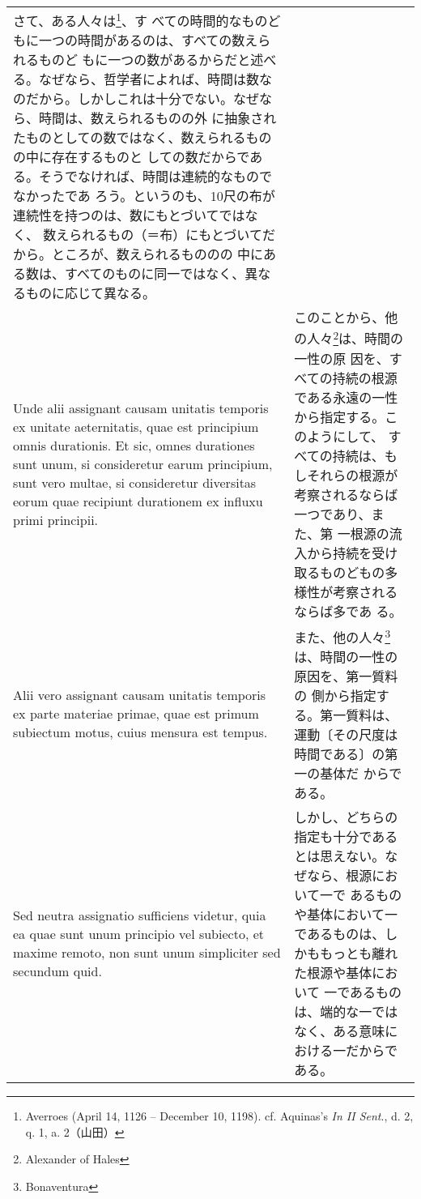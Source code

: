 \documentclass[10pt]{jsarticle} %
\begin{document}
\begin{longtable}{p{21em}p{21em}}
さて、ある人々は\footnote{Averroes (April 14, 1126 -- December 10,
1198). cf. Aquinas's {\it In II Sent}., d. 2, q. 1, a. 2（山田）}、す
べての時間的なものどもに一つの時間があるのは、すべての数えられるものど
もに一つの数があるからだと述べる。なぜなら、哲学者によれば、時間は数な
のだから。しかしこれは十分でない。なぜなら、時間は、数えられるものの外
に抽象されたものとしての数ではなく、数えられるものの中に存在するものと
しての数だからである。そうでなければ、時間は連続的なものでなかったであ
ろう。というのも、10尺の布が連続性を持つのは、数にもとづいてではなく、
数えられるもの（＝布）にもとづいてだから。ところが、数えられるもののの
中にある数は、すべてのものに同一ではなく、異なるものに応じて異なる。


\\

Unde alii assignant causam unitatis temporis ex unitate
aeternitatis, quae est principium omnis durationis. Et sic, omnes
durationes sunt unum, si consideretur earum principium, sunt vero
multae, si consideretur diversitas eorum quae recipiunt durationem ex
influxu primi principii.

&

このことから、他の人々\footnote{Alexander of Hales}は、時間の一性の原
因を、すべての持続の根源である永遠の一性から指定する。このようにして、
すべての持続は、もしそれらの根源が考察されるならば一つであり、また、第
一根源の流入から持続を受け取るものどもの多様性が考察されるならば多であ
る。


\\


Alii vero assignant causam unitatis temporis ex
parte materiae primae, quae est primum subiectum motus, cuius mensura
est tempus.

&

また、他の人々\footnote{Bonaventura}は、時間の一性の原因を、第一質料の
側から指定する。第一質料は、運動〔その尺度は時間である〕の第一の基体だ
からである。

\\


Sed neutra assignatio sufficiens videtur, quia ea quae sunt
unum principio vel subiecto, et maxime remoto, non sunt unum simpliciter
sed secundum quid.

&

しかし、どちらの指定も十分であるとは思えない。なぜなら、根源において一で
あるものや基体において一であるものは、しかももっとも離れた根源や基体において
一であるものは、端的な一ではなく、ある意味における一だからである。


\end{longtable}
\end{document}

